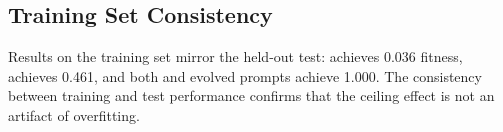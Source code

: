 \subsection{Training Set Consistency}
\label{sec:training}

Results on the training set mirror the held-out test: \zeroshot achieves 0.036 fitness, \simple achieves 0.461, and both \strongelicit and evolved prompts achieve 1.000.
The consistency between training and test performance confirms that the ceiling effect is not an artifact of overfitting.
